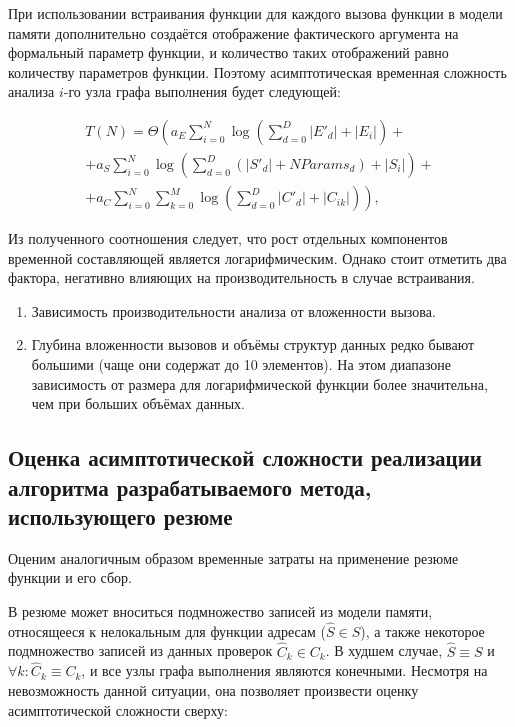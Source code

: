 При использовании встраивания функции для каждого вызова функции в модели памяти дополнительно создаётся отображение фактического аргумента на формальный параметр функции, и количество таких отображений равно количеству параметров функции. Поэтому асимптотическая временная сложность анализа $i$-го узла графа выполнения будет следующей:

\begin{equation}
\label{eq:inlining-full}
\begin{split}
 T(N) = \Theta \left( a_E \sum_{i=0}^N \log \left(\sum_{d = 0}^D |E'_d| + |E_i| \right) + \right. \\
 + a_S \sum_{i=0}^N \log \left(\sum_{d = 0}^D \left(|S'_d| + NParams_d \right) + |S_i|\right)+ \\
 + \left.a_C \sum_{i=0}^N \sum_{k=0}^M  \log \left(\sum_{d = 0}^D |C'_d|  + |C_{ik}|  \right) \right),
 \end{split}
\end{equation}

Из полученного соотношения следует, что рост отдельных компонентов временной составляющей является логарифмическим. Однако стоит отметить два фактора, негативно влияющих на производительность в случае встраивания.

\begin{enumerate}
 \item Зависимость производительности анализа от вложенности вызова.
 \item Глубина вложенности вызовов и объёмы структур данных редко бывают большими (чаще они содержат до 10 элементов). На этом диапазоне зависимость от размера для логарифмической функции более значительна, чем при больших объёмах данных.
\end{enumerate}


\subsection{Оценка асимптотической сложности реализации алгоритма разрабатываемого метода, использующего резюме}

Оценим аналогичным образом временные затраты на применение резюме функции и его сбор.

В резюме может вноситься подмножество записей из модели памяти, относящееся к нелокальным для функции адресам ($\widehat{S} \in S$), а также некоторое подмножество записей из данных проверок $\widehat{C}_k \in C_k$. В худшем случае, $\widehat{S} \equiv S$ и $\forall k: \widehat{C}_k \equiv C_k$, и все узлы графа выполнения являются конечными. Несмотря на невозможность данной ситуации, она позволяет произвести оценку асимптотической сложности сверху:

